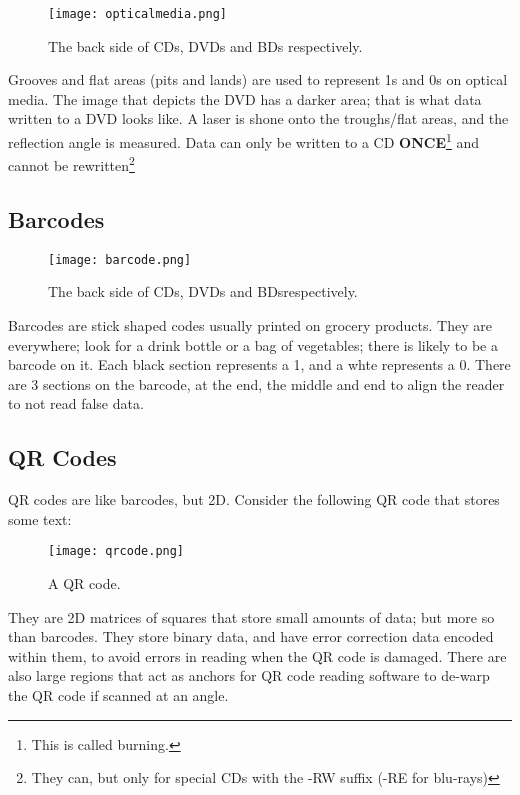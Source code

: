\documentclass[../main.tex]{subfiles}
\begin{document}
\begin{figure}[H]
    \centering
    \texttt{[image: opticalmedia.png]}
    \caption{The back side of CDs, DVDs and BDs respectively.}
    \label{fig:opticalmedia}
\end{figure}

Grooves and flat areas (pits and lands) are used to represent 1s and 0s on optical media. The image that depicts the DVD has a darker area; that is what data written to a DVD looks like. A laser is shone onto the troughs/flat areas, and the reflection angle is measured. Data can only be written to a CD \textbf{ONCE}\footnote{This is called burning.} and cannot be rewritten\footnote{They can, but only for special CDs with the -RW suffix (-RE for blu-rays)}

\subsection{Barcodes}

\begin{figure}[H]
    \centering
    \texttt{[image: barcode.png]}
    \caption{The back side of CDs, DVDs and BDsrespectively.}
    \label{fig:barcode_again}
\end{figure}

Barcodes are stick shaped codes usually printed on grocery products. They are everywhere; look for a drink bottle or a bag of vegetables; there is likely to be a barcode on it. Each black section represents a 1, and a whte represents a 0. There are 3 sections on the barcode, at the end, the middle and end to align the reader to not read false data.

\subsection{QR Codes}

QR codes are like barcodes, but 2D. Consider the following QR code that stores some text:

\begin{figure}[H]
    \centering
    \texttt{[image: qrcode.png]}
    \caption{A QR code.}
    \label{fig:qrcode}
\end{figure}

They are 2D matrices of squares that store small amounts of data; but more so than barcodes. They store binary data, and have error correction data encoded within them, to avoid errors in reading when the QR code is damaged. There are also large regions that act as anchors for QR code reading software to de-warp the QR code if scanned at an angle.
\end{document}
